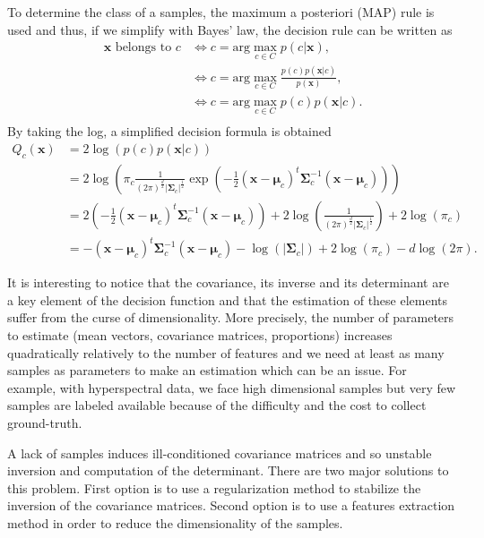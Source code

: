 \documentclass[a4paper,11pt,DIV=16]{scrartcl}
\begin{document}
    To determine the class of a samples, the maximum a posteriori (MAP) rule is used and thus, if we simplify with Bayes' law, the decision rule can be written as
    \begin{align*}
        \mathbf{x} \text{ belongs to } c &\Leftrightarrow c = \text{arg} \max_{c \in C} p(c|\mathbf{x}),\\
                                         &\Leftrightarrow c = \text{arg} \max_{c \in C} \frac{p(c) p(\mathbf{x}|c)}{p(\mathbf{x})},\\
                                         &\Leftrightarrow c = \text{arg} \max_{c \in C} p(c) p(\mathbf{x}|c).\\
    \end{align*}
    By taking the log, a simplified decision formula is obtained
    \begin{align}
        Q_c(\mathbf{x})
        &= 2 \log \left( p(c) p(\mathbf{x}|c) \right) \nonumber \\
        &= 2 \log \left( \pi_c \frac{1}{(2\pi)^{\frac{d}{2}} |\boldsymbol{\Sigma}_c|^{\frac{1}{2}}} \exp \left( -\frac{1}{2} (\mathbf{x} - \boldsymbol{\mu}_c)^t \boldsymbol{\Sigma}_c^{-1} (\mathbf{x} - \boldsymbol{\mu}_c) \right) \right) \nonumber \\
        &= 2 \left( -\frac{1}{2} (\mathbf{x} - \boldsymbol{\mu}_c)^t \boldsymbol{\Sigma}_c^{-1} (\mathbf{x} - \boldsymbol{\mu}_c) \right) + 2 \log \left( \frac{1}{(2\pi)^{\frac{d}{2}} |\boldsymbol{\Sigma}_c|^{\frac{1}{2}}} \right) + 2 \log (\pi_c) \nonumber \\
        &= - (\mathbf{x} - \boldsymbol{\mu}_c)^t \boldsymbol{\Sigma}_c^{-1} (\mathbf{x} - \boldsymbol{\mu}_c) - \log (|\boldsymbol{\Sigma}_c|) + 2 \log (\pi_c) - d \log (2\pi).
        \label{eq:decision}
    \end{align}

    It is interesting to notice that the covariance, its inverse and its determinant are a key element of the decision function and that the estimation of these elements suffer from the curse of dimensionality. More precisely, the number of parameters to estimate (mean vectors, covariance matrices, proportions) increases quadratically relatively to the number of features and we need at least as many samples as parameters to make an estimation which can be an issue. For example, with hyperspectral data, we face high dimensional samples but very few samples are labeled available because of the difficulty and the cost to collect ground-truth.

    A lack of samples induces ill-conditioned covariance matrices and so unstable inversion and computation of the determinant. There are two major solutions to this problem. First option is to use a regularization method to stabilize the inversion of the covariance matrices. Second option is to use a features extraction method in order to reduce the dimensionality of the samples.
\end{document}

